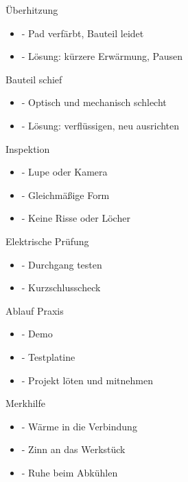 \begin{frame}{Überhitzung}
\begin{itemize}\setlength{\itemsep}{3mm}
    \item - Pad verfärbt, Bauteil leidet
    \item - Lösung: kürzere Erwärmung, Pausen
\end{itemize}
\end{frame}

\begin{frame}{Bauteil schief}
\begin{itemize}\setlength{\itemsep}{3mm}
    \item - Optisch und mechanisch schlecht
    \item - Lösung: verflüssigen, neu ausrichten
\end{itemize}
\end{frame}

\begin{frame}{Inspektion}
\begin{itemize}\setlength{\itemsep}{3mm}
    \item - Lupe oder Kamera
    \item - Gleichmäßige Form
    \item - Keine Risse oder Löcher
\end{itemize}
\end{frame}

\begin{frame}{Elektrische Prüfung}
\begin{itemize}\setlength{\itemsep}{3mm}
    \item - Durchgang testen
    \item - Kurzschlusscheck
\end{itemize}
\end{frame}

\begin{frame}{Ablauf Praxis}
\begin{itemize}\setlength{\itemsep}{3mm}
    \item - Demo
    \item - Testplatine
    \item - Projekt löten und mitnehmen
\end{itemize}
\end{frame}

\begin{frame}{Merkhilfe}
\begin{itemize}\setlength{\itemsep}{3mm}
    \item - Wärme in die Verbindung
    \item - Zinn an das Werkstück
    \item - Ruhe beim Abkühlen
\end{itemize}
\end{frame}



